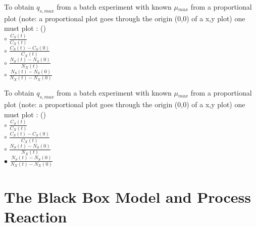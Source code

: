 \documentclass[]{beamer}
\begin{document}
\begin{frame}[shrink] {}
\color{blue}

To obtain $q_{s,max}$ from a batch experiment with known $\mu$$_{max}$ from a proportional plot (note: a proportional plot goes through the origin (0,0) of a x,y plot) one must plot :  ({\color{red}{Q11}})\\[0.5em]
\color{black}
\setlength{\parindent}{-0.4cm}
{\color{red}$\circ$} $\frac{C_S(t)}{C_X(t)}$  \\[0.3em]
{\color{red}$\circ$} $\frac{C_S(t)-C_S(0)}{C_X(t)}$  \\[0.3em]
{\color{red}$\circ$} $\frac{N_S(t)-N_S(0)}{N_X(t)}$  \\[0.3em]
{\color{red}$\circ$} $\frac{N_S(t)-N_S(0)}{N_X(t)-N_X(0)}$  \\[0.3em]
\end{frame}
\begin{frame}[shrink] {}
\color{blue}

To obtain $q_{s,max}$ from a batch experiment with known $\mu$$_{max}$ from a proportional plot (note: a proportional plot goes through the origin (0,0) of a x,y plot) one must plot :  ({\color{green}{Q11}})\\[0.5em]
\color{black}
\setlength{\parindent}{-0.4cm}
{\color{red}$\circ$} $\frac{C_S(t)}{C_X(t)}$  \\[0.3em]
{\color{red}$\circ$} $\frac{C_S(t)-C_S(0)}{C_X(t)}$  \\[0.3em]
{\color{red}$\circ$} $\frac{N_S(t)-N_S(0)}{N_X(t)}$  \\[0.3em]
{\color{red}$\bullet$} $\frac{N_S(t)-N_S(0)}{N_X(t)-N_X(0)}$  \\[0.3em]
\end{frame}


\section{The Black Box Model and Process Reaction}
\end{document}
